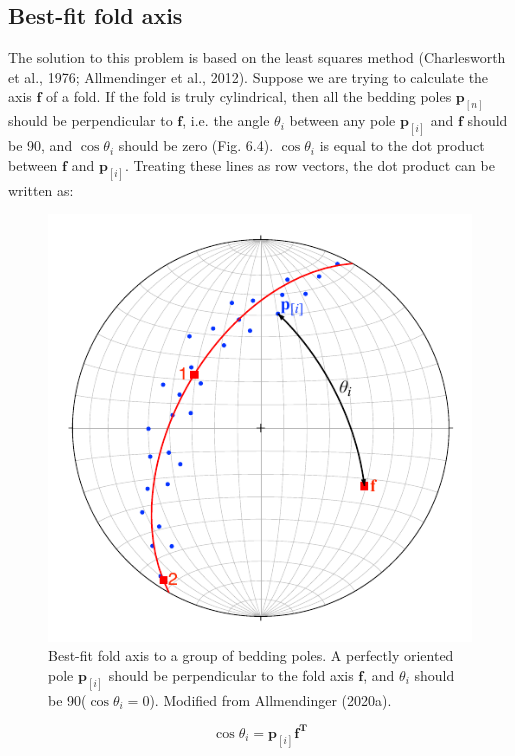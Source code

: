 \documentclass[a4paper , 12pt]{book}
\begin{document}
\subsection{Best-fit fold axis}

The solution to this problem is based on the least squares method (Charlesworth et al., 1976; Allmendinger et al., 2012). Suppose we are trying to calculate the axis $\mathbf{f}$ of a fold. If the fold is truly cylindrical, then all the bedding poles $\mathbf{p}_{[n]}$ should be perpendicular to $\mathbf{f}$, i.e. the angle $\theta_i$ between any pole $\mathbf{p}_{[i]}$ and $\mathbf{f}$ should be 90\degree, and $\cos\theta_i$ should be zero (Fig. 6.4). $\cos\theta_i$ is equal to the dot product between $\mathbf{f}$ and $\mathbf{p}_{[i]}$. Treating these lines as row vectors, the dot product can be written as:

\begin{figure}[ht]
    \centering
    \includegraphics{ch6f4.pdf}
    \caption{Best-fit fold axis to a group of bedding poles. A perfectly oriented pole $\mathbf{p}_{[i]}$ should be perpendicular to the fold axis $\mathbf{f}$, and $\theta_i$ should be 90\degree\space ($\cos\theta_i = 0$). Modified from Allmendinger (2020a).}
\end{figure}

\begin{equation}
    \cos\theta_i=\mathbf{p}_{[i]}\mathbf{f^T}
\end{equation}
\end{document}
